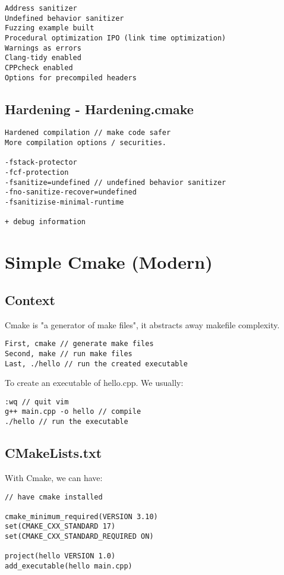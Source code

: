 \documentclass[openany]{report}
\begin{document}
\begin{verbatim}
Address sanitizer
Undefined behavior sanitizer
Fuzzing example built
Procedural optimization IPO (link time optimization)
Warnings as errors
Clang-tidy enabled
CPPcheck enabled
Options for precompiled headers
\end{verbatim}

\subsection{Hardening - Hardening.cmake}

\begin{verbatim}
Hardened compilation // make code safer
More compilation options / securities.

-fstack-protector
-fcf-protection
-fsanitize=undefined // undefined behavior sanitizer
-fno-sanitize-recover=undefined
-fsanitizise-minimal-runtime

+ debug information 
\end{verbatim}

\section{Simple Cmake (Modern)}

\subsection{Context}

Cmake is "a generator of make files", it abstracts away makefile complexity.

\begin{verbatim}
First, cmake // generate make files
Second, make // run make files
Last, ./hello // run the created executable
\end{verbatim}

To create an executable of hello.cpp. We usually:
\begin{verbatim}
:wq // quit vim
g++ main.cpp -o hello // compile 
./hello // run the executable
\end{verbatim}

\subsection{CMakeLists.txt}

With Cmake, we can have:

\begin{verbatim}
// have cmake installed

cmake_minimum_required(VERSION 3.10)
set(CMAKE_CXX_STANDARD 17)
set(CMAKE_CXX_STANDARD_REQUIRED ON)

project(hello VERSION 1.0)
add_executable(hello main.cpp)
\end{verbatim}
\end{document}
